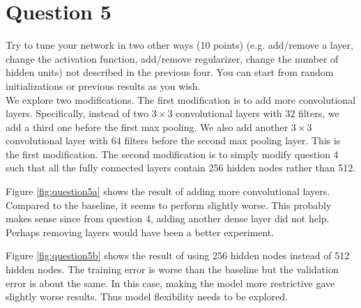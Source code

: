 \documentclass[paper=a4, fontsize=11pt]{scrartcl}
\begin{document}
\section{Question 5}

{\small Try to tune your network in two other ways (10 points) (e.g. add/remove a layer, change the activation function, add/remove regularizer, change the number of hidden units) not described in the previous four. You can start from random initializations or previous results as you wish.}\\

We explore two modifications. The first modification is to add more convolutional layers.  Specifically, instead of two $3 \times 3$ convolutional layers with $32$ filters, we add a third one before the first max pooling.  We also add another $3 \times 3$ convolutional layer with $64$ filters before the second max pooling layer.  This is the first modification.  The second modification is to simply modify question 4 such that all the fully connected layers contain 256 hidden nodes rather than 512.

Figure \ref{fig:question5a} shows the result of adding more convolutional layers.  Compared to the baseline, it seems to perform slightly worse.  This probably makes sense since from question 4, adding another dense layer did not help.  Perhaps removing layers would have been a better experiment.

Figure \ref{fig:question5b} shows the result of using 256 hidden nodes instead of 512 hidden nodes.  The training error is worse than the baseline but the validation error is about the same.  In this case, making the model more restrictive gave slightly worse results.  Thus model flexibility needs to be explored.
\end{document}
